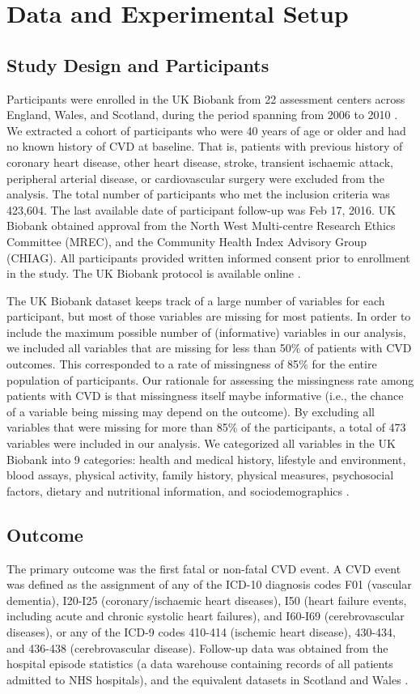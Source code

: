 \documentclass [PhD] {uclathes}
\begin{document}
\section{Data and Experimental Setup}
\label{ch7sec1}
\subsection{Study Design and Participants}
Participants were enrolled in the UK Biobank from 22 assessment centers across England, Wales, and Scotland, during the period spanning from 2006 to 2010 \cite{sudlow2015uk}. We extracted a cohort of participants who were 40 years of age or older and had no known history of CVD at baseline. That is, patients with previous history of coronary heart disease, other heart disease, stroke, transient ischaemic attack, peripheral arterial disease, or cardiovascular surgery were excluded from the analysis. The total number of participants who met the inclusion criteria was 423,604. The last available date of participant follow-up was Feb 17, 2016. UK Biobank obtained approval from the North West Multi-centre Research Ethics Committee (MREC), and the Community Health Index Advisory Group (CHIAG). All participants provided written informed consent prior to enrollment in the study. The UK Biobank protocol is available online \cite{palmer2007uk}.  

The UK Biobank dataset keeps track of a large number of variables for each participant, but most of those variables are missing for most patients. In order to include the maximum possible number of (informative) variables in our analysis, we included all variables that are missing for less than 50$\%$ of patients with CVD outcomes. This corresponded to a rate of missingness of 85$\%$ for the entire population of participants. Our rationale for assessing the missingness rate among patients with CVD is that missingness itself maybe informative (i.e., the chance of a variable being missing may depend on the outcome). By excluding all variables that were missing for more than 85$\%$ of the participants, a total of 473 variables were included in our analysis. We categorized all variables in the UK Biobank into 9 categories: health and medical history, lifestyle and environment, blood assays, physical activity, family history, physical measures, psychosocial factors, dietary and nutritional information, and sociodemographics \cite{ganna20155}.
 

\subsection{Outcome}
The primary outcome was the first fatal or non-fatal CVD event. A CVD event was defined as the assignment of any of the ICD-10 diagnosis codes F01 (vascular dementia), I20-I25 (coronary/ischaemic heart diseases), I50 (heart failure events, including acute and chronic systolic heart failures), and I60-I69 (cerebrovascular diseases), or any of the ICD-9 codes 410-414 (ischemic heart disease), 430-434, and 436-438 (cerebrovascular disease). Follow-up data was obtained from the hospital episode statistics (a data warehouse containing records of all patients admitted to NHS hospitals), and the equivalent datasets in Scotland and Wales \cite{adamska2015challenges}.  
\end{document}
